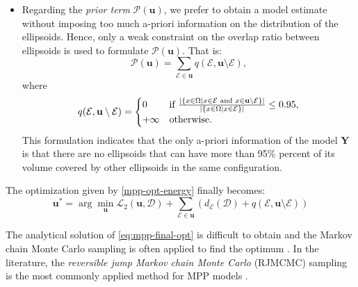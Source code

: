 \documentclass[journal]{IEEEtran}
\begin{document}
\begin{itemize}
\item Regarding the \textit{prior term} $\mathcal{P} (\mathbf{u})$, we
  prefer to obtain a model estimate without imposing too much a-priori
  information on the distribution of the ellipsoids. Hence, only a
  weak constraint on the overlap ratio between ellipsoids is used to
  formulate $\mathcal{P} (\mathbf{u})$. That is:
  \begin{equation}
    \label{eq:prior-term}
    \mathcal{P} (\mathbf{u}) = \sum_{\mathcal{E} \in \mathbf{u}}
    q(\mathcal{E}, \mathbf{u} \setminus \mathcal{E}),
  \end{equation}
  where
  \begin{equation}
    \label{eq:prior-term-detail}
    q(\mathcal{E}, \mathbf{u} \setminus \mathcal{E}) =
    \begin{cases}
      0 & \textnormal{if }\frac{ | \{ x \in \Omega | x \in \mathcal{E}
        \textnormal{ and } x \in \mathbf{u} \setminus \mathcal{E} \}
        |} { | \{ x \in \Omega | x \in \mathcal{E} \} |}
      \le 0.95, \\
      +\infty & \textnormal{otherwise}.
    \end{cases}
  \end{equation}
  This formulation indicates that the only a-priori information of the
  model $\mathbf{Y}$ is that there are no ellipsoids that can have
  more than 95\% percent of its volume covered by other ellipsoids in
  the same configuration.

\end{itemize}

The optimization given by \eqref{mpp-opt-energy} finally becomes:
\begin{equation}
  \label{eq:mpp-final-opt}
  \mathbf{u}^{*}
  = \arg \min_{\mathbf{u}} \mathcal{L}_{2}(\mathbf{u},
  \mathcal{D}) + \sum_{\mathcal{E} \in \mathbf{u}} \left(
    d_{\mathcal{E}} (\mathcal{D}) + q(\mathcal{E}, \mathbf{u}
    \setminus \mathcal{E}) \right)
\end{equation}

The analytical solution of \eqref{eq:mpp-final-opt} is difficult to
obtain and the Markov chain Monte Carlo sampling is often applied to
find the optimum \cite{lafarge2010geometric}. In the literature, the
\textit{reversible jump Markov chain Monte Carlo} (RJMCMC) sampling is
the most commonly applied method for MPP models
\cite{geyer1994simulation} \cite{green1995reversible}
\cite{tu2002image} \cite{descombes2009object} \cite{ge2009marked}
\cite{lafarge2010geometric} \cite{utasi20113}
\cite{sirinukunwattana2015stochastic}.
\end{document}
